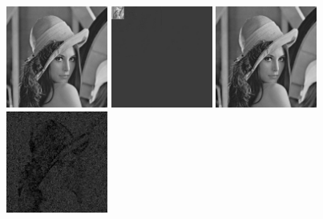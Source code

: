 \documentclass{article}
\begin{document}
\includegraphics[width=0.25\textwidth]{../data/lenna.jpg}
\includegraphics[width=0.25\textwidth]{../data/symlet_transform_lenna.jpg}
\includegraphics[width=0.25\textwidth]{../data/symlet_lenna.jpg}
\includegraphics[width=0.25\textwidth]{../data/delta_symlet_lenna.jpg}
\end{document}
